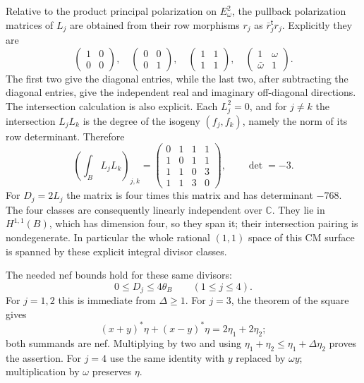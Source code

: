 Relative to the product principal polarization on $E_\omega^2$,
the pullback polarization matrices of $L_j$ are obtained from their
row morphisms $r_j$ as $\bar r_j^{\mathsf t}r_j$. Explicitly they are
\[
\begin{pmatrix}1&0\\0&0\end{pmatrix},\quad
\begin{pmatrix}0&0\\0&1\end{pmatrix},\quad
\begin{pmatrix}1&1\\1&1\end{pmatrix},\quad
\begin{pmatrix}1&\omega\\\bar\omega&1\end{pmatrix}.
\tag{G10.5}
\]
The first two give the diagonal entries, while the last two, after
subtracting the diagonal entries, give the independent real and
imaginary off-diagonal directions. The intersection calculation is
also explicit. Each $L_j^2=0$, and for $j\ne k$ the intersection
$L_jL_k$ is the degree of the isogeny $(f_j,f_k)$, namely the norm
of its row determinant. Therefore
\[
\left(\int_B L_jL_k\right)_{j,k}=
\begin{pmatrix}
0&1&1&1\\
1&0&1&1\\
1&1&0&3\\
1&1&3&0
\end{pmatrix},
\qquad \det=-3.
\tag{G10.6}
\]
For $D_j=2L_j$ the matrix is four times this matrix and has
determinant $-768$. The four classes are consequently linearly
independent over $\mathbb C$. They lie in $H^{1,1}(B)$, which
has dimension four, so they span it; their intersection pairing is
nondegenerate. In particular the whole rational $(1,1)$ space of
this CM surface is spanned by these explicit integral divisor
classes.

The needed nef bounds hold for these same divisors:
\[
0\le D_j\le4\theta_B\qquad (1\le j\le4).
\tag{G10.7}
\]
For $j=1,2$ this is immediate from $\Delta\ge1$.
For $j=3$, the theorem of the square gives
\[
(x+y)^*\eta+(x-y)^*\eta=2\eta_1+2\eta_2;
\]
both summands are nef. Multiplying by two and using
$\eta_1+\eta_2\le\eta_1+\Delta\eta_2$ proves the assertion.
For $j=4$ use the same identity with $y$ replaced by $\omega y$;
multiplication by $\omega$ preserves $\eta$.

